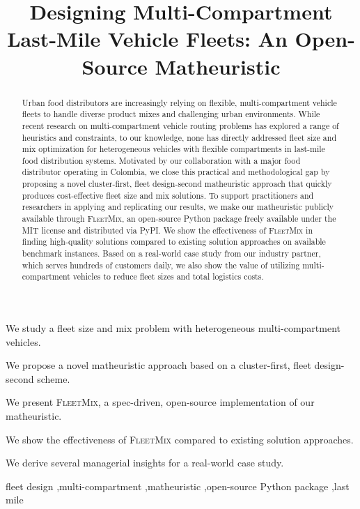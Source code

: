 \documentclass[11pt]{elsarticle}
\theoremstyle{plain}
\begin{document}

\begin{frontmatter}

\title{Designing Multi-Compartment Last-Mile Vehicle Fleets: An Open-Source Matheuristic}

\onehalfspacing

\begin{highlights}
\item We study a fleet size and mix problem with heterogeneous multi-compartment vehicles.
\item We propose a novel matheuristic approach based on a cluster-first, fleet design-second scheme.
\item We present \textsc{FleetMix}, a spec-driven, open-source implementation of our matheuristic.
\item We show the effectiveness of \textsc{FleetMix} compared to existing solution approaches.
\item We derive several managerial insights for a real-world case study.
\end{highlights}

\begin{abstract}	
Urban food distributors are increasingly relying on flexible, multi-compartment vehicle fleets to handle diverse product mixes and challenging urban environments. While recent research on multi-compartment vehicle routing problems has explored a range of heuristics and constraints, to our knowledge, none has directly addressed fleet size and mix optimization for heterogeneous vehicles with flexible compartments in last-mile food distribution systems. Motivated by our collaboration with a major food distributor operating in Colombia, we close this practical and methodological gap by proposing a novel cluster-first, fleet design-second matheuristic approach that quickly produces cost-effective fleet size and mix solutions. 
To support practitioners and researchers in applying and replicating our results, we make our matheuristic publicly available through \textsc{FleetMix}, an open-source Python package freely available under the MIT license and distributed via PyPI.
We show the effectiveness of \textsc{FleetMix} in finding high-quality solutions compared to existing solution approaches on available benchmark instances. Based on a real-world case study from our industry partner, which serves hundreds of customers daily, we also show the value of utilizing multi-compartment vehicles to reduce fleet sizes and total logistics costs.
\end{abstract} 

\begin{keyword}
fleet design \sep multi-compartment \sep matheuristic \sep open-source Python package \sep last mile
\end{keyword}
	
\end{frontmatter}
\end{document}

